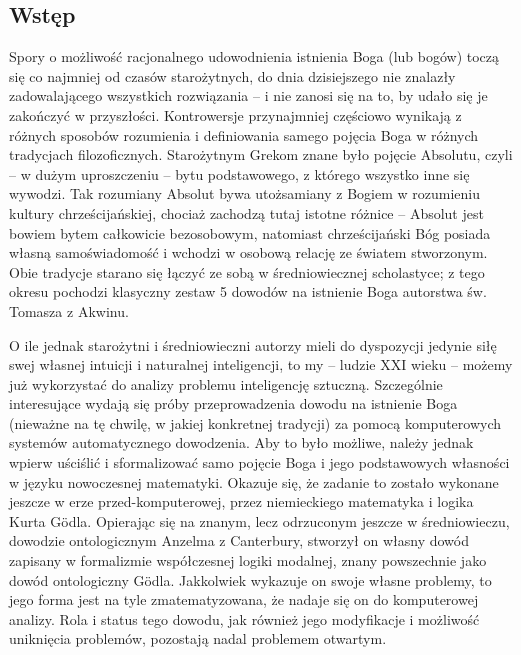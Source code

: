 \documentclass[12pt]{article}
\begin{document}
\begin{multicols}{2}

\section{Wstęp} \label{sec:intro}
Spory o możliwość racjonalnego udowodnienia istnienia Boga (lub bogów) toczą się co najmniej od czasów starożytnych, do dnia dzisiejszego nie znalazły zadowalającego wszystkich rozwiązania -- i nie zanosi się na to, by udało się je zakończyć w przyszłości. Kontrowersje przynajmniej częściowo wynikają z różnych sposobów rozumienia i definiowania samego pojęcia Boga w różnych tradycjach filozoficznych. Starożytnym Grekom znane było pojęcie Absolutu, czyli -- w dużym uproszczeniu -- bytu podstawowego, z którego wszystko inne się wywodzi. Tak rozumiany Absolut bywa utożsamiany z Bogiem w rozumieniu kultury chrześcijańskiej, chociaż zachodzą tutaj istotne różnice -- Absolut jest bowiem bytem całkowicie bezosobowym, natomiast chrześcijański Bóg posiada własną samoświadomość i wchodzi w osobową relację ze światem stworzonym. Obie tradycje starano się łączyć ze sobą w średniowiecznej scholastyce; z tego okresu pochodzi klasyczny zestaw 5 dowodów na istnienie Boga autorstwa św. Tomasza z Akwinu. 

O ile jednak starożytni i średniowieczni autorzy mieli do dyspozycji jedynie siłę swej własnej intuicji i naturalnej inteligencji, to my -- ludzie XXI wieku -- możemy już wykorzystać do analizy problemu inteligencję sztuczną. Szczególnie interesujące wydają się próby przeprowadzenia dowodu na istnienie Boga (nieważne na tę chwilę, w jakiej konkretnej tradycji) za pomocą komputerowych systemów automatycznego dowodzenia. Aby to było możliwe, należy jednak wpierw uściślić i sformalizować samo pojęcie Boga i jego podstawowych własności w języku nowoczesnej matematyki. Okazuje się, że zadanie to zostało wykonane jeszcze w erze przed-komputerowej, przez niemieckiego matematyka i logika Kurta G\"odla. Opierając się na znanym, lecz odrzuconym jeszcze w średniowieczu, dowodzie ontologicznym Anzelma z Canterbury, stworzył on własny dowód zapisany w formalizmie współczesnej logiki modalnej, znany powszechnie jako dowód ontologiczny G\"odla. Jakkolwiek wykazuje on swoje własne problemy, to jego forma jest na tyle zmatematyzowana, że nadaje się on do komputerowej analizy. Rola i status tego dowodu, jak również jego modyfikacje i możliwość uniknięcia problemów, pozostają nadal problemem otwartym. 


\end{multicols}
\end{document}
